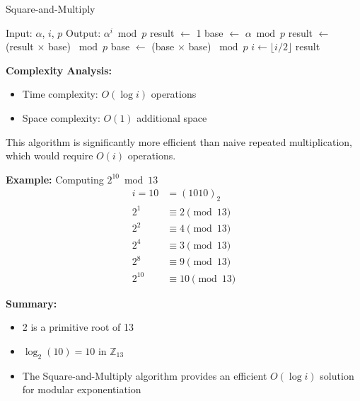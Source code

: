\documentclass[11pt,epsfig]{article}
\begin{document}
\begin{description}
\begin{algorithm}[H]
\caption{Square-and-Multiply}
\begin{algorithmic}[1]
\STATE Input: $\alpha$, $i$, $p$
\STATE Output: $\alpha^i \bmod p$
\STATE result $\leftarrow$ 1
\STATE base $\leftarrow$ $\alpha \bmod p$
\STATE result $\leftarrow$ (result $\times$ base) $\bmod p$
\ENDIF
\STATE base $\leftarrow$ (base $\times$ base) $\bmod p$
\STATE $i \leftarrow \lfloor i/2 \rfloor$
\ENDWHILE
\RETURN result
\end{algorithmic}
\end{algorithm}
\textbf{Complexity Analysis:}
\begin{itemize}
    \item Time complexity: $O(\log i)$ operations
    \item Space complexity: $O(1)$ additional space
\end{itemize}

This algorithm is significantly more efficient than naive repeated multiplication, which would require $O(i)$ operations.

\textbf{Example:} Computing $2^{10} \bmod 13$
\begin{align*}
i = 10 &= (1010)_2 \\
2^1 &\equiv 2 \pmod{13} \\
2^2 &\equiv 4 \pmod{13} \\
2^4 &\equiv 3 \pmod{13} \\
2^8 &\equiv 9 \pmod{13} \\
2^{10} &\equiv 10 \pmod{13}
\end{align*}

\textbf{Summary:}
\begin{itemize}
    \item 2 is a primitive root of 13
    \item $\log_2(10) = 10$ in $\mathbb{Z}_{13}$
    \item The Square-and-Multiply algorithm provides an efficient $O(\log i)$ solution for modular exponentiation
\end{itemize}


\end{description} 
\end{document}
